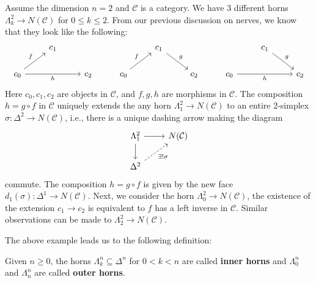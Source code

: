\begin{example}
    Assume the dimension \(n=2\) and \(\mathcal{C}\) is a category. We have 3 different horns \(\Lambda^2_k\rightarrow N(\mathcal{C})\) for \(0\leq k\leq 2\). From our previous discussion on nerves, we know that they look like the following:
    \[\begin{tikzcd}
            & {c_1} &&& {c_1} &&& {c_1} \\
            {c_0} && {c_2} & {c_0} && {c_2} & {c_0} && {c_2}
            \arrow["g", from=1-5, to=2-6]
            \arrow["g", from=1-8, to=2-9]
            \arrow["f", from=2-1, to=1-2]
            \arrow["h"', from=2-1, to=2-3]
            \arrow["f", from=2-4, to=1-5]
            \arrow["h"', from=2-7, to=2-9]
        \end{tikzcd}\]
    Here \(c_0,c_1,c_2\) are objects in \(\mathcal{C}\), and \(f,g,h\) are morphisms in \(\mathcal{C}\). The composition \(h=g\circ f\) in \(\mathcal{C}\) uniquely extends the any horn \(\Lambda^2_1\rightarrow N(\mathcal{C})\) to an entire 2-simplex \(\sigma:\Delta^2\rightarrow N(\mathcal{C})\), i.e., there is a unique dashing arrow making the diagram
    \[\begin{tikzcd}
            {\Lambda^2_1} & {N(\mathcal{C})} \\
            {\Delta^2}
            \arrow[from=1-1, to=1-2]
            \arrow[from=1-1, to=2-1]
            \arrow["{\exists !\sigma}"', dashed, from=2-1, to=1-2]
        \end{tikzcd}\]
    commute. The composition \(h=g\circ f\) is given by the new face \(d_1(\sigma):\Delta^1\rightarrow N(\mathcal{C})\). Next, we consider the horn \(\Lambda^2_0\rightarrow N(\mathcal{C})\), the existence of the extension \(c_1\rightarrow c_2\) is equivalent to \(f\) has a left inverse in \(\mathcal{C}\). Similar observations can be made to \(\Lambda^2_2\rightarrow N(\mathcal{C})\).
\end{example}
The above example leads us to the following definition:
\begin{definition}
    Given \(n\geq 0\), the horns \(\Lambda^n_k\subseteq \Delta^n\) for \(0<k<n\) are called \textbf{inner horns} and \(\Lambda^n_0\) and \(\Lambda^n_n\) are called \textbf{outer horns}.
\end{definition}

